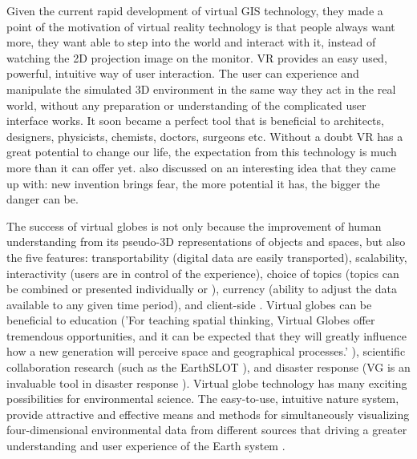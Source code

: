 Given the current rapid development of virtual GIS technology, they made a point of the motivation of virtual reality technology is that people always want more, they want able to step into the world and interact with it, instead of watching the 2D projection image on the monitor. VR provides an easy used, powerful, intuitive way of user interaction. The user can experience and manipulate the simulated 3D environment in the same way they act in the real world, without any preparation or understanding of the complicated user interface works. It soon became a perfect tool that is beneficial to architects, designers, physicists, chemists, doctors, surgeons etc. Without a doubt VR has a great potential to change our life, the expectation from this technology is much more than it can offer yet. \cite{mazuryk.vr.1996} also discussed on an interesting idea that they came up with: new invention brings fear, the more potential it has, the bigger the danger can be.

The success of virtual globes \cite{tuttle.virtual-globes.2008} is not only because the improvement of human understanding from its pseudo-3D representations of objects and spaces, but also the five features: transportability (digital data are easily transported), scalability, interactivity (users are in control of the experience), choice of topics (topics can be combined or presented individually or ), currency (ability to adjust the data available to any given time period), and client-side \cite{tuttle.virtual-globes.2008}. Virtual globes can be beneficial to education ('For teaching spatial thinking, Virtual Globes offer tremendous opportunities, and it can be expected that they will greatly influence how a new generation will perceive space and geographical processes.' \cite{nuernberger.vr-classroom.2006}), scientific collaboration research (such as the EarthSLOT \cite{earthslot.2016}), and disaster response (VG is an invaluable tool in disaster response \cite{butler.vg.2006, nourbakhsh.mapping-disaster-zones.2006}). Virtual globe technology has many exciting possibilities for environmental science. The easy-to-use, intuitive nature system, provide attractive and effective means and methods for simultaneously visualizing four-dimensional environmental data from different sources that driving a greater understanding and user experience of the Earth system \cite{blower.sharing-visualizing.2007}. 

